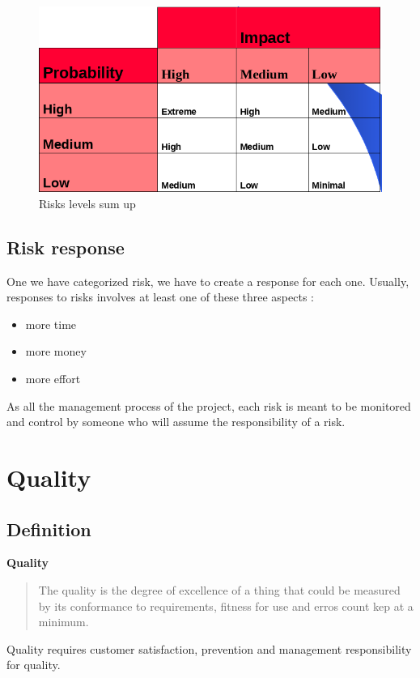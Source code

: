 \documentclass{article}
\begin{document}
\begin{figure}[h]
	\centering
	\includegraphics[scale=0.5]{riskLevel.png}
	\caption{Risks levels sum up}
\end{figure}

\subsection{Risk response}
One we have categorized risk, we have to create a response for each one. Usually, responses to risks involves at least one of these three aspects :
   \begin{itemize}
       \item more time
       \item more money
       \item more effort
   \end{itemize}
As all the management process of the project, each risk is meant to be monitored and control by someone who will assume the responsibility of a risk.

\section{Quality}
\subsection{Definition}
\textbf{Quality}
\begin{quote}
    The quality is the degree of excellence of a thing that could be measured by its conformance to requirements, fitness for use and erros count kep at a minimum.
\end{quote}

Quality requires customer satisfaction, prevention and management responsibility for quality.\newline\newline
\end{document}
